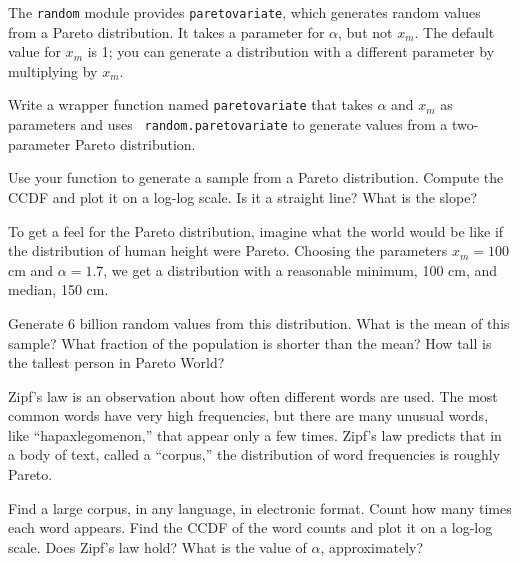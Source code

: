 \documentclass[12pt]{book}
\begin{document}
\begin{exercise}
The {\tt random} module provides {\tt paretovariate},
which generates random values from a Pareto distribution.  It takes
a parameter for $\alpha$, but not $x_{m}$.  The
default value for $x_{m}$ is 1; you can generate a distribution
with a different parameter by multiplying by $x_{m}$.

Write a wrapper function named {\tt paretovariate} that takes
$\alpha$ and $x_{m}$ as parameters and uses {\tt
  random.paretovariate} to generate values from a two-parameter Pareto
distribution.

Use your function to generate a sample from a Pareto distribution.
Compute the CCDF and plot it on a log-log scale.  Is it a straight
line?  What is the slope?

\end{exercise}

\begin{exercise}
To get a feel for the Pareto distribution, imagine what the world
would be like if the distribution of human height were Pareto.
Choosing the parameters $x_{m} = 100$ cm and $\alpha = 1.7$, we
get a distribution with a reasonable minimum, 100 cm,
and median, 150 cm.

Generate 6 billion random values from this distribution.  What is the
mean of this sample?  What fraction of the population is shorter than
the mean?  How tall is the tallest person in Pareto World?

\end{exercise}

\begin{exercise}
Zipf's law is an observation about how often different words are used.
The most common words have very high frequencies, but there are many
unusual words, like ``hapaxlegomenon,'' that appear only a few times.
Zipf's law predicts that in a body of text, called a ``corpus,'' the
distribution of word frequencies is roughly Pareto.

Find a large corpus, in any language, in electronic
format.  Count how many times each word appears.  Find the CCDF of the
word counts and plot it on a log-log scale.  Does Zipf's law hold?
What is the value of $\alpha$, approximately?

\end{exercise}
\end{document}
